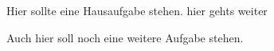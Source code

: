 \documentclass[a4paper, 11pt, ngerman]{scrartcl}
\begin{document}

\begin{hausaufgabe}
	Hier sollte eine Hausaufgabe stehen.
	\newpage
	hier gehts weiter
\end{hausaufgabe}

\begin{hausaufgabe}
	Auch hier soll noch eine weitere Aufgabe stehen.
\end{hausaufgabe}
\end{document}
